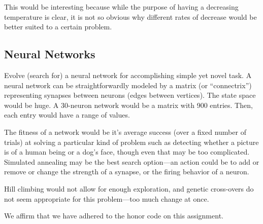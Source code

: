\documentclass[11pt]{amsart}
\newcommand{\honor}{We affirm that we have adhered to the honor code on this assignment.}
\begin{document}
This would be interesting because while the purpose of having a decreasing
temperature is clear, it is not so obvious why different rates of decrease
would be better suited to a certain problem.

\subsection*{Neural Networks}
Evolve (search for) a neural network for accomplishing simple yet novel task. A
neural network can be straightforwardly modeled by a matrix (or “connectrix”)
representing synapses between neurons (edges between vertices). The state space
would be huge. A 30-neuron network would be a matrix with 900 entries. Then,
each entry would have a range of values.

The fitness of a network would be it's average success (over a fixed number of
trials) at solving a particular kind of problem such as detecting whether a
picture is of a human being or a dog's face, though even that may be too
complicated. Simulated annealing may be the best search option\----an action could
be to add or remove or change the strength of a synapse, or the firing behavior
of a neuron.

Hill climbing would not allow for enough exploration, and genetic cross-overs
do not seem appropriate for this problem\----too much change at once.

\honor
\end{document}
